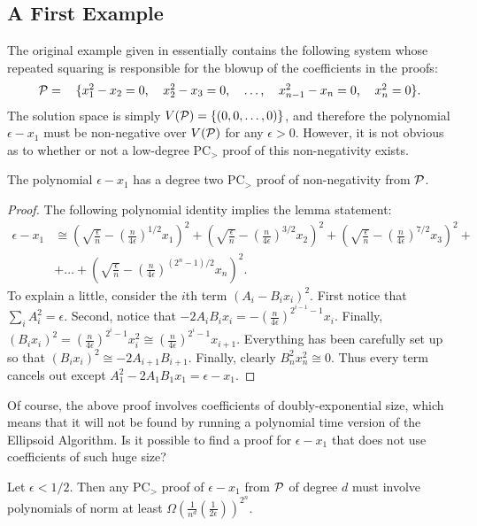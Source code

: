 \subsection{A First Example}
The original example given in \cite{ODon16} essentially contains the following system whose repeated squaring is responsible for the blowup of the coefficients in the proofs:
\[\begin{tabular}{cccccc}
$\cP = $ & $\{x_1^2 - x_2 = 0$, & $x_2^2 - x_3 = 0$, & $\dots$, & $x_{n-1}^2 - x_n = 0$, & $x_n^2 = 0\}$.
\end{tabular}\]
The solution space is simply $V(\mathcal P) = \{(0,0,\dots,0)\}$, and therefore the polynomial $\epsilon - x_1$ must be non-negative over $V(\mathcal P)$ for any $\epsilon > 0$. However, it is not obvious as to whether or not a low-degree PC$_>$ proof of this non-negativity exists.
\begin{lemma}
The polynomial $\epsilon - x_1$ has a degree two PC$_>$ proof of non-negativity from $\mathcal P$.
\end{lemma}
\begin{proof}
The following polynomial identity implies the lemma statement:
\begin{align}
\epsilon - x_1 &\cong\left(\sqrt{\frac{\epsilon}{n}} - \left(\frac{n}{4\epsilon}\right)^{1/2}x_1\right)^2 + \left(\sqrt{\frac{\epsilon}{n}} - \left(\frac{n}{4\epsilon}\right)^{3/2}x_2\right)^2 + \left(\sqrt{\frac{\epsilon}{n}} - \left(\frac{n}{4\epsilon}\right)^{7/2}x_3\right)^2 + \nonumber\\
&+\dots + \left(\sqrt{\frac{\epsilon}{n}} - \left(\frac{n}{4\epsilon}\right)^{(2^n-1)/2}x_n\right)^2.\label{eq:proof}\tag{$*$}
\end{align}
To explain a little, consider the $i$th term $(A_i - B_ix_i)^2$. First notice that $\sum_i A_i^2 = \epsilon$. Second, notice that $-2A_iB_ix_i = -\left(\frac{n}{4\epsilon}\right)^{2^{i-1}-1}x_i$. Finally, $(B_ix_i)^2 = \left(\frac{n}{4\epsilon}\right)^{2^i-1}x_i^2 \cong \left(\frac{n}{4\epsilon}\right)^{2^i-1}x_{i+1}$. Everything has been carefully set up so that $(B_ix_i)^2 \cong -2A_{i+1}B_{i+1}$. Finally, clearly $B_n^2x_n^2 \cong 0$. Thus every term cancels out except $A_1^2-2A_1B_1x_1 = \epsilon-x_1$. 
\end{proof}
%
Of course, the above proof involves coefficients of doubly-exponential size, which means that it will not be found by running a polynomial time version of the Ellipsoid Algorithm. Is it possible to find a proof for $\epsilon - x_1$ that does not use coefficients of such huge size?
\begin{lemma}\label{lem:nonbool-complex}
Let $\epsilon < 1/2$. Then any PC$_>$ proof of $\epsilon - x_1$ from $\mathcal P$ of degree $d$ must involve polynomials of norm at least $\Omega\left(\frac{1}{n^d}\left(\frac{1}{2\epsilon}\right)\right)^{2^n}$.
\end{lemma}
